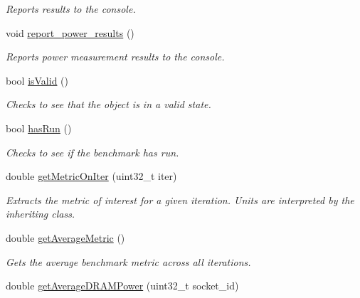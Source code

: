 \begin{DoxyCompactItemize}
\begin{DoxyCompactList}\small\item\em Reports results to the console. \end{DoxyCompactList}\item 
\hypertarget{classxmem_1_1benchmark_1_1_benchmark_a3cd60d59ac20e06f89cd3b4777bda5c7}{void \hyperlink{classxmem_1_1benchmark_1_1_benchmark_a3cd60d59ac20e06f89cd3b4777bda5c7}{report\-\_\-power\-\_\-results} ()}\label{classxmem_1_1benchmark_1_1_benchmark_a3cd60d59ac20e06f89cd3b4777bda5c7}

\begin{DoxyCompactList}\small\item\em Reports power measurement results to the console. \end{DoxyCompactList}\item 
bool \hyperlink{classxmem_1_1benchmark_1_1_benchmark_a5b08d817dd61666037957a3e23861512}{is\-Valid} ()
\begin{DoxyCompactList}\small\item\em Checks to see that the object is in a valid state. \end{DoxyCompactList}\item 
bool \hyperlink{classxmem_1_1benchmark_1_1_benchmark_a41afaa57de8ef2c66d31a41fa5f100c8}{has\-Run} ()
\begin{DoxyCompactList}\small\item\em Checks to see if the benchmark has run. \end{DoxyCompactList}\item 
double \hyperlink{classxmem_1_1benchmark_1_1_benchmark_a8bd36816a1414eaf488a6b63ba407200}{get\-Metric\-On\-Iter} (uint32\-\_\-t iter)
\begin{DoxyCompactList}\small\item\em Extracts the metric of interest for a given iteration. Units are interpreted by the inheriting class. \end{DoxyCompactList}\item 
double \hyperlink{classxmem_1_1benchmark_1_1_benchmark_a0beee3c5527e78ddb180ff20fe299e64}{get\-Average\-Metric} ()
\begin{DoxyCompactList}\small\item\em Gets the average benchmark metric across all iterations. \end{DoxyCompactList}\item 
double \hyperlink{classxmem_1_1benchmark_1_1_benchmark_aade8f8ba1268de6e112c222932b4224d}{get\-Average\-D\-R\-A\-M\-Power} (uint32\-\_\-t socket\-\_\-id)

\end{DoxyCompactItemize}
